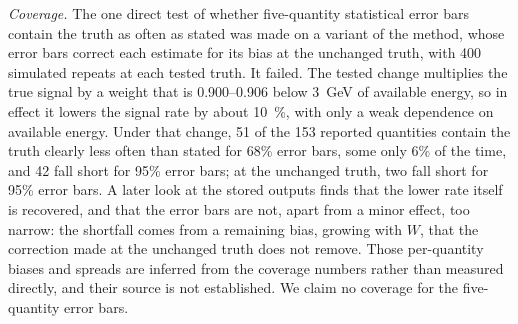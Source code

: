 
\emph{Coverage.} The one direct test of whether five-quantity statistical error bars contain the truth as often as stated was made on a variant of the method, whose error bars correct each estimate for its bias at the unchanged truth, with 400 simulated repeats at each tested truth. It failed. The tested change multiplies the true signal by a weight that is 0.900--0.906 below \SI{3}{GeV} of available energy, so in effect it lowers the signal rate by about \SI{10}{\percent}, with only a weak dependence on available energy. Under that change, 51 of the 153 reported quantities contain the truth clearly less often than stated for 68\% error bars, some only 6\% of the time, and 42 fall short for 95\% error bars; at the unchanged truth, two fall short for 95\% error bars. A later look at the stored outputs finds that the lower rate itself is recovered, and that the error bars are not, apart from a minor effect, too narrow: the shortfall comes from a remaining bias, growing with $W$, that the correction made at the unchanged truth does not remove. Those per-quantity biases and spreads are inferred from the coverage numbers rather than measured directly, and their source is not established. We claim no coverage for the five-quantity error bars.

